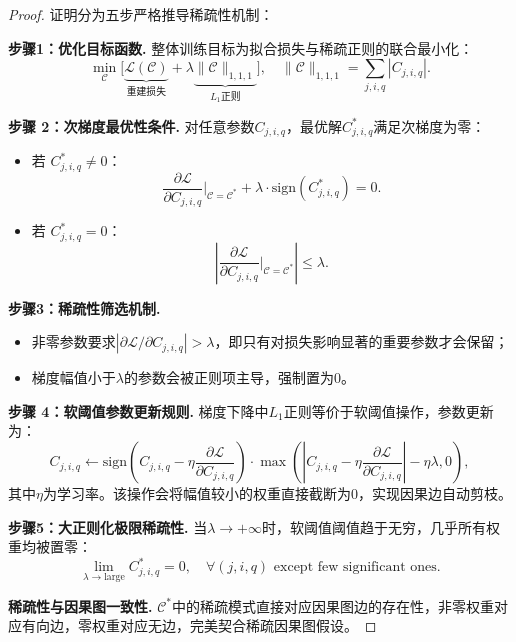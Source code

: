 \begin{proof}
	证明分为五步严格推导稀疏性机制：
	
	\noindent\textbf{步骤1：优化目标函数.}
	整体训练目标为拟合损失与稀疏正则的联合最小化：
	\begin{equation}
		\min_{\mathcal{C}} \Big[ \underbrace{\mathcal{L}(\mathcal{C})}_{\text{重建损失}} + \lambda \underbrace{\|\mathcal{C}\|_{1,1,1}}_{L_1\text{正则}} \Big], \quad \|\mathcal{C}\|_{1,1,1} = \sum_{j,i,q} |C_{j,i,q}|.
	\end{equation}
	
	\noindent\textbf{步骤 2：次梯度最优性条件.}
	对任意参数$C_{j,i,q}$，最优解$C^*_{j,i,q}$满足次梯度为零：
	\begin{itemize}
		\item 若 $C_{j,i,q}^* \neq 0$：
		\begin{equation}
			\frac{\partial \mathcal{L}}{\partial C_{j,i,q}} \bigg|_{\mathcal{C}=\mathcal{C}^*} + \lambda \cdot \text{sign}(C_{j,i,q}^*) = 0.
		\end{equation}
		\item 若 $C_{j,i,q}^* = 0$：
		\begin{equation}
			\left| \frac{\partial \mathcal{L}}{\partial C_{j,i,q}} \bigg|_{\mathcal{C}=\mathcal{C}^*} \right| \leq \lambda.
		\end{equation}
	\end{itemize}
	
	\noindent\textbf{步骤3：稀疏性筛选机制.}
	\begin{itemize}
		\item 非零参数要求$|\partial \mathcal{L}/\partial C_{j,i,q}| > \lambda$，即只有对损失影响显著的重要参数才会保留；
		\item 梯度幅值小于$\lambda$的参数会被正则项主导，强制置为0。
	\end{itemize}
	
	\noindent\textbf{步骤 4：软阈值参数更新规则.}
	梯度下降中$L_1$正则等价于软阈值操作，参数更新为：
	\begin{equation}
		C_{j,i,q} \gets \text{sign}\left(C_{j,i,q} - \eta \frac{\partial \mathcal{L}}{\partial C_{j,i,q}}\right) \cdot \max\left( \left|C_{j,i,q} - \eta \frac{\partial \mathcal{L}}{\partial C_{j,i,q}}\right| - \eta \lambda, 0 \right),
	\end{equation}
	其中$\eta$为学习率。该操作会将幅值较小的权重直接截断为0，实现因果边自动剪枝。
	
	\noindent\textbf{步骤5：大正则化极限稀疏性.}
	当$\lambda \to +\infty$时，软阈值阈值趋于无穷，几乎所有权重均被置零：
	\begin{equation}
		\lim_{\lambda \to \text{large}} C_{j,i,q}^* = 0, \quad \forall (j,i,q) \text{ except few significant ones}.
	\end{equation}
	
	\noindent\textbf{稀疏性与因果图一致性.}
	$\mathcal{C}^*$中的稀疏模式直接对应因果图边的存在性，非零权重对应有向边，零权重对应无边，完美契合稀疏因果图假设。
\end{proof}

